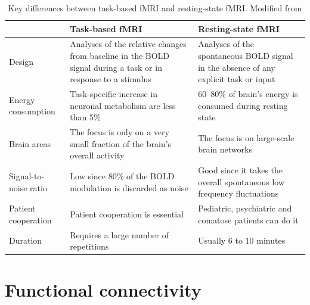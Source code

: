 \begin{table}[htb]
    \centering
    \caption[Key differences between task-based fMRI and resting-state fMRI]{Key differences between task-based fMRI and resting-state fMRI. Modified from \citet{smitha_resting_2017}}
    \label{tab:method:fMRI-paradigm}
    \begin{tabularx}{\textwidth}{lXX}
    \toprule
                          & Task-based fMRI                                                                                                 & Resting-state fMRI                                                                   \\ \midrule
    Design                & Analyses of the relative changes from baseline in the BOLD signal during a task or in response to a stimulus    & Analyses of the spontaneous BOLD signal in the absence of any explicit task or input \\
    Energy consumption    & Task-specific increase in neuronal metabolism are less than 5\%                                                 & 60–80\% of brain’s energy is consumed during resting state                           \\
    Brain areas           & The focus is only on a very small fraction of the brain’s overall activity                                      & The focus is on large-scale brain networks                                           \\
    Signal-to-noise ratio & Low since 80\% of the BOLD modulation is discarded as noise                                                     & Good since it takes the overall spontaneous low frequency fluctuations               \\
    Patient cooperation   & Patient cooperation is essential                                                                                & Pediatric, psychiatric and comatose patients can do it                               \\
    Duration              & Requires a large number of repetitions                                                                          & Usually 6 to 10 minutes                                                              \\ \bottomrule
    \end{tabularx}%
\end{table}

\section{Functional connectivity}
\label{sec:fmri:fc}

